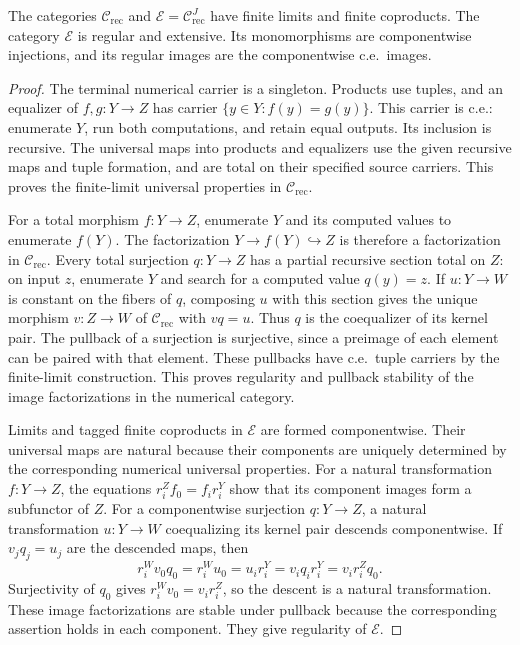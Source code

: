 \begin{proposition}\label{prop:fork-total}
The categories $\mathcal C_{\mathrm{rec}}$ and
$\mathcal E=\mathcal C_{\mathrm{rec}}^J$ have finite limits and
finite coproducts. The category $\mathcal E$ is regular and
extensive. Its monomorphisms are componentwise injections, and its
regular images are the componentwise c.e.\ images.
\end{proposition}
\begin{proof}
The terminal numerical carrier is a singleton. Products use tuples,
and an equalizer of $f,g:Y\to Z$ has carrier
$\{y\in Y:f(y)=g(y)\}$. This carrier is c.e.: enumerate $Y$, run
both computations, and retain equal outputs. Its inclusion is
recursive. The universal maps into products and equalizers use the
given recursive maps and tuple formation, and are total on their
specified source carriers. This proves the finite-limit universal
properties in $\mathcal C_{\mathrm{rec}}$.

For a total morphism $f:Y\to Z$, enumerate $Y$ and its computed
values to enumerate $f(Y)$. The factorization
$Y\to f(Y)\hookrightarrow Z$ is therefore a factorization in
$\mathcal C_{\mathrm{rec}}$. Every total surjection
$q:Y\to Z$ has a partial recursive section total on $Z$: on input
$z$, enumerate $Y$ and search for a computed value $q(y)=z$.
If $u:Y\to W$ is constant on the fibers of $q$, composing $u$
with this section gives the unique morphism $v:Z\to W$ of
$\mathcal C_{\mathrm{rec}}$ with $vq=u$. Thus $q$ is the
coequalizer of its kernel pair.
The pullback of a surjection is surjective, since a preimage of
each element can be paired with that element. These pullbacks
have c.e.\ tuple carriers by the finite-limit construction.
This proves regularity and pullback stability of the image
factorizations in the numerical category.

Limits and tagged finite coproducts in $\mathcal E$ are formed
componentwise. Their universal maps are natural because their
components are uniquely determined by the corresponding numerical
universal properties. For a natural transformation $f:Y\to Z$,
the equations $r_i^Zf_0=f_i r_i^Y$ show that its component images
form a subfunctor of $Z$.
For a componentwise surjection $q:Y\to Z$, a natural transformation
$u:Y\to W$ coequalizing its kernel pair descends componentwise.
If $v_jq_j=u_j$ are the descended maps, then
\[
 r_i^Wv_0q_0=r_i^Wu_0=u_i r_i^Y
 =v_iq_i r_i^Y=v_i r_i^Zq_0.
\]
Surjectivity of $q_0$ gives $r_i^Wv_0=v_i r_i^Z$, so the
descent is a natural transformation. These image factorizations are stable
under pullback because the corresponding assertion holds in
each component. They give regularity of $\mathcal E$.


\end{proof}
